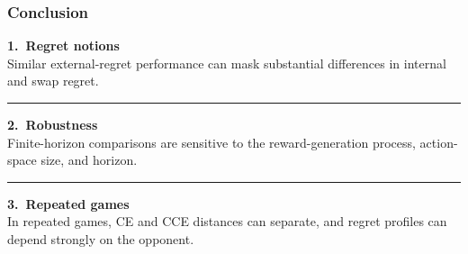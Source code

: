\begin{frame}
  \frametitle{Conclusion}

  \vspace{0.3cm}

  \hspace*{0.04\textwidth}
  \begin{minipage}{0.92\textwidth}

    {\bfseries 1.\ Regret notions}\\[0.16cm]
    Similar external-regret performance can mask substantial
    differences in internal and swap regret.

    \vspace{-0.08cm}
    \textcolor{TUMblue}{\rule{\linewidth}{0.35pt}}

    \vspace{0.24cm}

    {\bfseries 2.\ Robustness}\\[0.16cm]
    Finite-horizon comparisons are sensitive to the
    reward-generation process, action-space size, and horizon.

    \vspace{-0.08cm}
    \textcolor{TUMblue}{\rule{\linewidth}{0.35pt}}

    \vspace{0.24cm}

    {\bfseries 3.\ Repeated games}\\[0.16cm]
    In repeated games, CE and CCE distances can separate,
    and regret profiles can depend strongly on the opponent.

  \end{minipage}

\end{frame}
